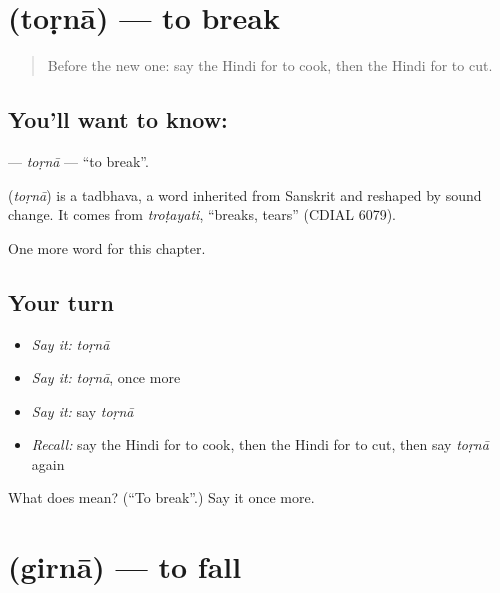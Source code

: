 \section[\texorpdfstring{\hi{तोड़ना} (toṛnā)}{तोड़ना (toṛnā)}]{ (toṛnā) — to break}

\label{lesson:HI-C161-torna}



\begin{quote}
Before the new one: say the Hindi for to cook, then the Hindi for to cut.
\end{quote}

\subsection*{You'll want to know: }
\textbf{} — \emph{toṛnā} — \textquotedblleft{}to break\textquotedblright{}.

\begin{cousinweb}
\textbf{} (\emph{toṛnā}) is a tadbhava, a word inherited from Sanskrit and reshaped by sound change. It comes from \emph{troṭayati}, \textquotedblleft{}breaks, tears\textquotedblright{} (CDIAL 6079).
\end{cousinweb}

\begin{grammarlens}[title={What you've built}]
One more word for this chapter.
\end{grammarlens}

\subsection*{Your turn}
\begin{itemize}
\raggedright
  \item \emph{Say it:} \emph{toṛnā}
  \item \emph{Say it:} \emph{toṛnā}, once more
  \item \emph{Say it:} say \emph{toṛnā}
  \item \emph{Recall:} say the Hindi for to cook, then the Hindi for to cut, then say \emph{toṛnā} again
\end{itemize}

\begin{tcolorbox}[breakable,colback=teal!4,colframe=teal!35!black,title={Before you move on}]
What does  mean? (\textquotedblleft{}To break\textquotedblright{}.) Say it once more.
\end{tcolorbox}
\section[\texorpdfstring{\hi{गिरना} (girnā)}{गिरना (girnā)}]{ (girnā) — to fall}

